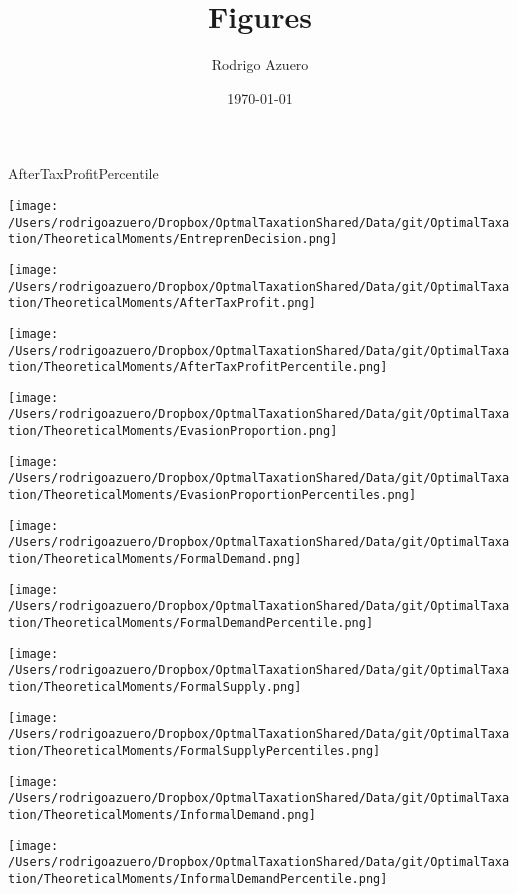 \documentclass[12pt]{article}
\title{\vspace{-3cm}Figures}
\author{Rodrigo Azuero}
\date{\today}
\begin{document}
\maketitle





\doublespacing
AfterTaxProfitPercentile


\texttt{[image: /Users/rodrigoazuero/Dropbox/OptmalTaxationShared/Data/git/OptimalTaxation/TheoreticalMoments/EntreprenDecision.png]}

\texttt{[image: /Users/rodrigoazuero/Dropbox/OptmalTaxationShared/Data/git/OptimalTaxation/TheoreticalMoments/AfterTaxProfit.png]}

\texttt{[image: /Users/rodrigoazuero/Dropbox/OptmalTaxationShared/Data/git/OptimalTaxation/TheoreticalMoments/AfterTaxProfitPercentile.png]}


\texttt{[image: /Users/rodrigoazuero/Dropbox/OptmalTaxationShared/Data/git/OptimalTaxation/TheoreticalMoments/EvasionProportion.png]}

\texttt{[image: /Users/rodrigoazuero/Dropbox/OptmalTaxationShared/Data/git/OptimalTaxation/TheoreticalMoments/EvasionProportionPercentiles.png]}

\texttt{[image: /Users/rodrigoazuero/Dropbox/OptmalTaxationShared/Data/git/OptimalTaxation/TheoreticalMoments/FormalDemand.png]}

\texttt{[image: /Users/rodrigoazuero/Dropbox/OptmalTaxationShared/Data/git/OptimalTaxation/TheoreticalMoments/FormalDemandPercentile.png]}

\texttt{[image: /Users/rodrigoazuero/Dropbox/OptmalTaxationShared/Data/git/OptimalTaxation/TheoreticalMoments/FormalSupply.png]}

\texttt{[image: /Users/rodrigoazuero/Dropbox/OptmalTaxationShared/Data/git/OptimalTaxation/TheoreticalMoments/FormalSupplyPercentiles.png]}

\texttt{[image: /Users/rodrigoazuero/Dropbox/OptmalTaxationShared/Data/git/OptimalTaxation/TheoreticalMoments/InformalDemand.png]}

\texttt{[image: /Users/rodrigoazuero/Dropbox/OptmalTaxationShared/Data/git/OptimalTaxation/TheoreticalMoments/InformalDemandPercentile.png]}
\end{document}
